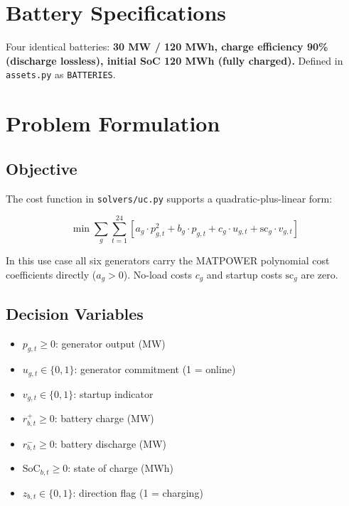 \documentclass[11pt,a4paper]{article}
\begin{document}
\section{Battery Specifications}

Four identical batteries: \textbf{30 MW / 120 MWh, charge efficiency 90\% (discharge lossless),
initial SoC 120 MWh (fully charged).} Defined in \texttt{assets.py} as \texttt{BATTERIES}.

\section{Problem Formulation}

\subsection{Objective}

The cost function in \texttt{solvers/uc.py} supports a quadratic-plus-linear form:

\[
  \min \sum_g \sum_{t=1}^{24} \left[ a_g \cdot p_{g,t}^2 + b_g \cdot p_{g,t} + c_g \cdot u_{g,t} + \mathrm{sc}_g \cdot v_{g,t} \right]
\]

In this use case all six generators carry the MATPOWER polynomial cost coefficients directly
($a_g > 0$). No-load costs $c_g$ and startup costs $\mathrm{sc}_g$ are zero.

\subsection{Decision Variables}

\begin{itemize}
  \item $p_{g,t} \ge 0$: generator output (MW)
  \item $u_{g,t} \in \{0,1\}$: generator commitment (1 = online)
  \item $v_{g,t} \in \{0,1\}$: startup indicator
  \item $r^+_{b,t} \ge 0$: battery charge (MW)
  \item $r^-_{b,t} \ge 0$: battery discharge (MW)
  \item $\mathrm{SoC}_{b,t} \ge 0$: state of charge (MWh)
  \item $z_{b,t} \in \{0,1\}$: direction flag (1 = charging)
\end{itemize}
\end{document}
